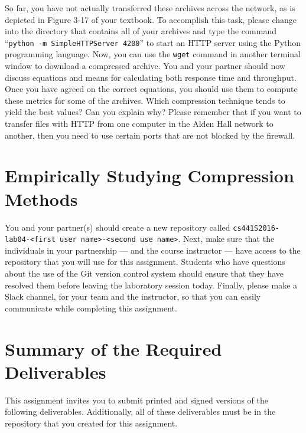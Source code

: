So far, you have not actually transferred these archives across the network, as is depicted in Figure 3-17 of your
textbook. To accomplish this task, please change into the directory that contains all of your archives and type the
command ``{\tt python -m SimpleHTTPServer 4200}'' to start an HTTP server using the Python programming language. Now,
you can use the {\tt wget} command in another terminal window to download a compressed archive. You and your partner
should now discuss equations and means for calculating both response time and throughput. Once you have agreed on the
correct equations, you should use them to compute these metrics for some of the archives. Which compression technique
tends to yield the best values? Can you explain why? Please remember that if you want to transfer files with HTTP from
one computer in the Alden Hall network to another, then you need to use certain ports that are not blocked by the
firewall.

\section*{Empirically Studying Compression Methods}

You and your partner(s) should create a new repository called {\tt cs441S2016-lab04-<first user name>-<second use
name>}.  Next, make sure that the individuals in your partnership --- and the course instructor --- have access to the
repository that you will use for this assignment.  Students who have questions about the use of the Git version control
system should ensure that they have resolved them before leaving the laboratory session today. Finally, please make a
Slack channel, for your team and the instructor, so that you can easily communicate while completing this assignment.



\section*{Summary of the Required Deliverables}

This assignment invites you to submit printed and signed versions of the following deliverables. Additionally,
all of these deliverables must be in the repository that you created for this assignment.

